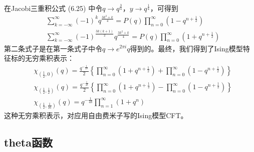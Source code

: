 在Jacobi三重积公式 (6.25) 中令$q \rightarrow q^{\frac{3}{4}} $，$ y \rightarrow q^{\frac{1}{4}} $，可得到
\begin{align} &\sum_{k=-\infty}^{\infty}(-1)^{k} q^{\frac{3 k^{2}+k}{4}}=P(q) \prod_{n=0}^{\infty} (1-q^{n+\frac{1}{2}} ) \\& \sum_{k=-\infty}^{\infty}(-1)^{\frac{3 k(k+1)}{2}} q^{\frac{3 k^{2}+k}{4}}=P(q) \prod_{n=0}^{\infty} (1+q^{n+\frac{1}{2}} ) \end{align}
第二条式子是在第一条式子中令$ q \rightarrow e^{2 \pi i} q $得到的。最终，我们得到了Ising模型特征标的无穷乘积表示：
\begin{align} &\chi_{\left(\frac{1}{2}, 0\right)}(q)=\frac{q^{-\frac{1}{48}}}{2}\left\{\prod_{n=0}^{\infty} (1+q^{n+\frac{1}{2}} )+\prod_{n=0}^{\infty} (1-q^{n+\frac{1}{2}} )\right\} \\ &\chi_{\left(\frac{1}{2}, \frac{1}{2}\right)}(q)=\frac{q^{-\frac{1}{48}}}{2}\left\{\prod_{n=0}^{\infty} (1+q^{n+\frac{1}{2}} )-\prod_{n=0}^{\infty} (1-q^{n+\frac{1}{2}} )\right\} \\ &\chi_{\left(\frac{1}{2}, \frac{1}{16}\right)}(q)=q^{-\frac{1}{48}} \prod_{n=1}^{\infty}\left(1+q^{n}\right) \end{align}
这种无穷乘积表示，对应用自由费米子写的Ising模型CFT。

\subsection{theta函数}

